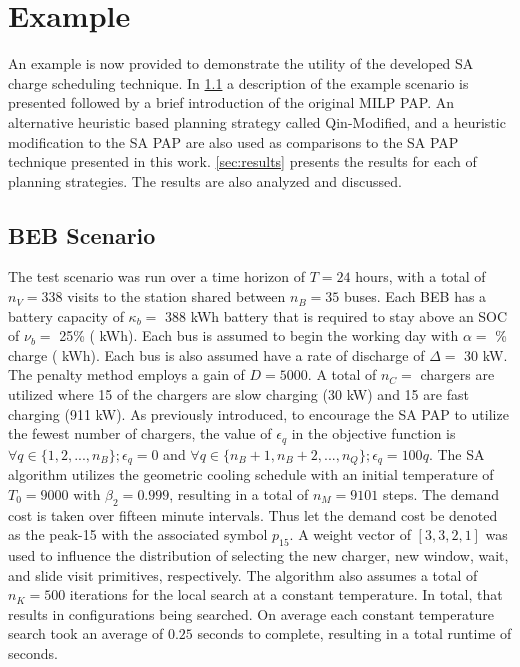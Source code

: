 \documentclass[energies,article,submit,moreauthors]{Definitions/mdpi}
\newcommand{\A}{35 }                                                            %
\newcommand{\N}{338 }                                                           %
\newcommand{\Cgain}{5000}                                                       %
\newcommand{\acharge}{0.9}                                                      %
\newcommand{\mincharge}{25\% }                                                  %
\newcommand{\minchargeD}{0.25 }                                                 %
\newcommand{\batsize}{388 }                                                     %
\newcommand{\fast}{15 }                                                         %
\newcommand{\slow}{15 }                                                         %
\newcommand{\fasts}{911 }                                                       %
\newcommand{\slows}{30 }                                                        %
\newcommand{\localcnt}{500 }                                                    %
\newcommand{\tempinit}{9000 }                                                   %
\newcommand{\tempcnt}{9101 }                                                    %
\newcommand{\quicklocal}{0.25 }                                                %
\begin{document}
\section{Example}
\label{sec:example}
An example is now provided to demonstrate the utility of the developed SA charge scheduling technique. In
\ref{sec:beb-scenario} a description of the example scenario is presented followed by a brief introduction of the original
MILP PAP. An alternative heuristic based planning strategy called Qin-Modified, and a heuristic modification to the SA
PAP are also used as comparisons to the SA PAP technique presented in this work. \ref{sec:results} presents the results for
each of planning strategies. The results are also analyzed and discussed.

\subsection{BEB Scenario}
\label{sec:beb-scenario}
The test scenario was run over a time horizon of \(T=24\) hours, with a total of \(n_V = \N\) visits to the station shared
between \(n_B = \A\) buses. Each BEB has a battery capacity of \(\kappa_b =\) \batsize kWh battery that is required to stay above
an SOC of \(\nu_b =\) \mincharge (\fpeval{\batsize * \minchargeD} kWh). Each bus is assumed to begin the working
day with \(\alpha =\) \fpeval{\acharge*100}\% charge (\fpeval{\acharge * \batsize} kWh). Each bus is also
assumed have a rate of discharge of \(\Delta =\) 30 kW. The penalty method employs a gain of \(D = \Cgain\). A total of \(n_C =\)
\fpeval{\fast + \slow} chargers are utilized where \slow of the chargers are slow charging (\slows kW) and
\fast are fast charging (\fasts kW). As previously introduced, to encourage the SA PAP to utilize the fewest number of
chargers, the value of \(\epsilon_q\) in the objective function is \(\forall q \in \{1,2,..., n_B \}; \epsilon_q = 0\) and \(\forall q \in \{n_B + 1, n_B +
2, ..., n_Q\}; \epsilon_q = 100q\). The SA algorithm utilizes the geometric cooling schedule with an initial temperature of \(T_0
= \tempinit\) with \(\beta_2 = 0.999\), resulting in a total of \(n_M = \tempcnt\) steps. The demand cost is taken over fifteen
minute intervals. Thus let the demand cost be denoted as the peak-15 with the associated symbol \(p_{15}\). A weight
vector of \([3, 3, 2, 1]\) was used to influence the distribution of selecting the new charger, new window, wait, and
slide visit primitives, respectively. The algorithm also assumes a total of \(n_K = \localcnt\) iterations for the local
search at a constant temperature. In total, that results in \fpeval{\localcnt * \tempcnt} configurations
being searched. On average each constant temperature search took an average of \(\quicklocal\) seconds to complete,
resulting in a total runtime of \fpeval{\quicklocal * \tempcnt} seconds.
\end{document}
